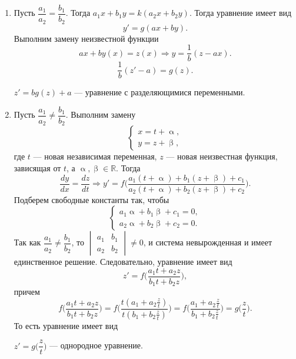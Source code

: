 \documentclass[a4paper, 12pt]{report}
\newcommand{\Rm}{\mathbb{R}}
\renewcommand{\alpha}{\upalpha}
\renewcommand{\beta}{\upbeta}
\begin{document}
\begin{enumerate}
	\item Пусть $\dfrac{a_1}{a_2} = \dfrac{b_1}{b_2}$. Тогда $a_1x + b_1y = k(a_2x + b_2y)$. Тогда уравнение имеет вид $$y' = g(ax + by).$$
	Выполним замену неизвестной функции $$ax + by(x) = z(x)\Rightarrow y = \dfrac{1}{b}(z-ax).$$
	$$\dfrac{1}{b}(z' - a) = g(z).$$
	\begin{center}
		$ z' = bg(z) + a$ --- уравнение с разделяющимися переменными.
	\end{center}
\item Пусть $\dfrac{a_1}{a_2}\ne \dfrac{b_1}{b_2}$. Выполним замену $$\begin{cases}
	x = t + \alpha,\\
	y = z + \beta,
\end{cases}$$
где $t$ --- новая независимая переменная, $z$ --- новая неизвестная функция, зависящая от $t$, а $\alpha,\beta \in \Rm$. Тогда $$\dfrac{dy}{dx} = \dfrac{dz}{dt}\Rightarrow y' = f\Big(\dfrac{a_1(t+\alpha) + b_1(z+\beta) + c_1}{a_2(t+\alpha) + b_2(z+\beta) + c_2}\Big).$$
Подберем свободные константы так, чтобы $$\begin{cases}
	a_1\alpha + b_1\beta + c_1 = 0,\\
	a_2\alpha + b_2\beta + c_2 = 0.
\end{cases}$$
Так как $\dfrac{a_1}{a_2}\ne \dfrac{b_1}{b_2}$, то $\begin{vmatrix}
	a_1&b_1\\
	a_2&b_2
\end{vmatrix}\ne 0$, и система невырожденная и имеет единственное решение. Следовательно, уравнение имеет вид $$z' = f\Big(\dfrac{a_1 t + a_2 z}{b_1 t + b_2 z}\Big),$$
причем $$f\Big(\dfrac{a_1 t + a_2 z}{b_1 t + b_2 z}\Big) = f\Big(\dfrac{t(a_1  + a_2 \frac{z}{t})}{t(b_1  + b_2 \frac{z}{t})}\Big) = f\Big(\dfrac{a_1  + a_2 \frac{z}{t}}{b_1  + b_2 \frac{z}{t}}\Big) = g\Big(\dfrac{z}{t}\Big).$$
То есть уравнение имеет вид \begin{center}
	$z' = g\Big(\dfrac{z}{t}\Big)$ --- однородное уравнение.
\end{center}
\end{enumerate}
\end{document}
